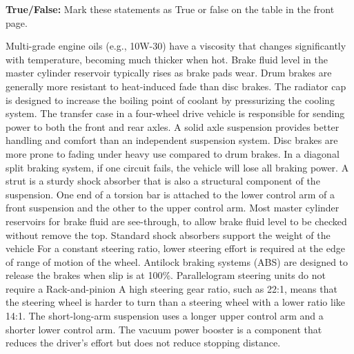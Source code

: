 \documentclass[12pt]{exam}
\begin{document}
	\begin{questions}
        \addpoints
        \begin{center}            
    \textbf{True/False:} Mark these statements as True or false on the table in the front page.
       \end{center}
            \question Multi-grade engine oils (e.g., 10W-30) have a viscosity that changes significantly with temperature, becoming much thicker when hot. %
            \question Brake fluid level in the master cylinder reservoir typically rises as brake pads wear.
            \question Drum brakes are generally more resistant to heat-induced fade than disc brakes. %
            \question The radiator cap is designed to increase the boiling point of coolant by pressurizing the cooling system. %
            \question The transfer case in a four-wheel drive vehicle is responsible for sending power to both the front and rear axles. %
            \question A solid axle suspension provides better handling and comfort than an independent suspension system. %
            \question Disc brakes are more prone to fading under heavy use compared to drum brakes. %
            \question In a diagonal split braking system, if one circuit fails, the vehicle will lose all braking power. %
			\question A strut is a sturdy shock absorber that is also a structural component of the suspension.						
			\question One end of a torsion bar is attached to the lower control arm of a front suspension and the other to the upper control arm.
			\question Most master cylinder reservoirs for brake fluid are see-through, to allow brake fluid level to be checked without remove the top.
			\question Standard shock absorbers support the weight of the vehicle
			\question For a constant steering ratio, lower steering effort is required at the edge of range of motion of the wheel.
            \question Antilock braking systems (ABS) are designed to release the brakes when slip is at 100\%.
            \question Parallelogram steering units do not require a Rack-and-pinion %
            \question A high steering gear ratio, such as 22:1, means that the steering wheel is harder to turn than a steering wheel with a lower ratio like 14:1. 
            \question The short-long-arm suspension uses a longer upper control arm and a shorter lower control arm.
            \question The vacuum power booster is a component that reduces the driver's effort but does not reduce stopping distance.           
		
		
		
		
		
        \end{questions}
\end{document}
